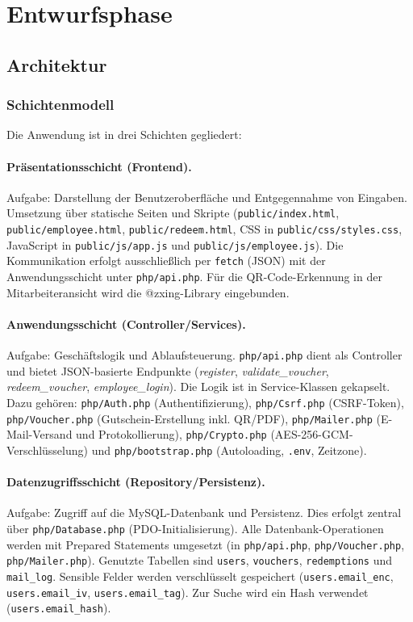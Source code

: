 \section{Entwurfsphase} 
\label{sec:Entwurfsphase}

\subsection{Architektur}

\subsubsection{Schichtenmodell}
Die Anwendung ist in drei Schichten gegliedert:

\paragraph{Präsentationsschicht (Frontend).}
Aufgabe: Darstellung der Benutzeroberfläche und Entgegennahme von Eingaben.  
Umsetzung über statische Seiten und Skripte (\texttt{public/index.html}, \texttt{public/employee.html}, \texttt{public/redeem.html}, CSS in \texttt{public/css/styles.css}, JavaScript in \texttt{public/js/app.js} und \texttt{public/js/employee.js}).  
Die Kommunikation erfolgt ausschließlich per \texttt{fetch} (\ac{JSON}) mit der Anwendungsschicht unter \texttt{php/api.php}.  
Für die QR-Code-Erkennung in der Mitarbeiteransicht wird die @zxing-Library eingebunden.

\paragraph{Anwendungsschicht (Controller/Services).}
Aufgabe: Geschäftslogik und Ablaufsteuerung.  
\texttt{php/api.php} dient als Controller und bietet \ac{JSON}-basierte Endpunkte (\zB \textit{register}, \textit{validate\_voucher}, \textit{redeem\_voucher}, \textit{employee\_login}).  
Die Logik ist in Service-Klassen gekapselt. Dazu gehören:  
\texttt{php/Auth.php} (Authentifizierung),  
\texttt{php/Csrf.php} (\ac{CSRF}-Token),  
\texttt{php/Voucher.php} (Gutschein-Erstellung inkl. QR/PDF),  
\texttt{php/Mailer.php} (E-Mail-Versand und Protokollierung),  
\texttt{php/Crypto.php} (\ac{AES}-256-GCM-Verschlüsselung)  
und \texttt{php/bootstrap.php} (Autoloading, \texttt{.env}, Zeitzone).

\paragraph{Datenzugriffsschicht (Repository/Persistenz).}
Aufgabe: Zugriff auf die MySQL-Datenbank und Persistenz.  
Dies erfolgt zentral über \texttt{php/Database.php} (PDO-Initialisierung).  
Alle Datenbank-Operationen werden mit Prepared Statements umgesetzt (\zB in \texttt{php/api.php}, \texttt{php/Voucher.php}, \texttt{php/Mailer.php}).  
Genutzte Tabellen sind \texttt{users}, \texttt{vouchers}, \texttt{redemptions} und \texttt{mail\_log}.  
Sensible Felder werden verschlüsselt gespeichert (\texttt{users.email\_enc}, \texttt{users.email\_iv}, \texttt{users.email\_tag}).  
Zur Suche wird ein Hash verwendet (\texttt{users.email\_hash}).

